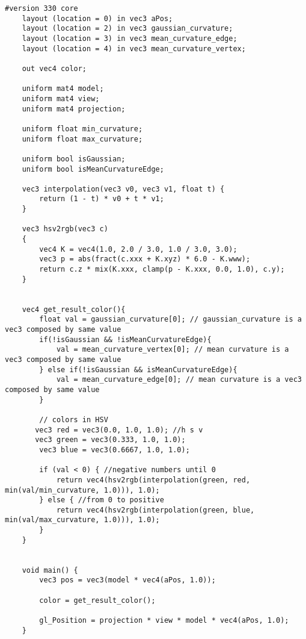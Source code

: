 \begin{lstlisting}[caption={Vertex Shader for constant/Gouraud Gaussian curvature and constant/Gouraud mean curvature (Sections: \ref{section:gc-curvature} and \ref{section:mc-curvature} \label{appendix:vs-curvature})}]
    #version 330 core
    layout (location = 0) in vec3 aPos;
    layout (location = 2) in vec3 gaussian_curvature;
    layout (location = 3) in vec3 mean_curvature_edge;
    layout (location = 4) in vec3 mean_curvature_vertex;

    out vec4 color;

    uniform mat4 model;
    uniform mat4 view;
    uniform mat4 projection;

    uniform float min_curvature;
    uniform float max_curvature;

    uniform bool isGaussian;
    uniform bool isMeanCurvatureEdge;

    vec3 interpolation(vec3 v0, vec3 v1, float t) {
        return (1 - t) * v0 + t * v1;
    }

    vec3 hsv2rgb(vec3 c)
    {
        vec4 K = vec4(1.0, 2.0 / 3.0, 1.0 / 3.0, 3.0);
        vec3 p = abs(fract(c.xxx + K.xyz) * 6.0 - K.www);
        return c.z * mix(K.xxx, clamp(p - K.xxx, 0.0, 1.0), c.y);
    }


    vec4 get_result_color(){
        float val = gaussian_curvature[0]; // gaussian_curvature is a vec3 composed by same value
        if(!isGaussian && !isMeanCurvatureEdge){
            val = mean_curvature_vertex[0]; // mean curvature is a vec3 composed by same value
        } else if(!isGaussian && isMeanCurvatureEdge){
            val = mean_curvature_edge[0]; // mean curvature is a vec3 composed by same value
        }

        // colors in HSV
       vec3 red = vec3(0.0, 1.0, 1.0); //h s v
       vec3 green = vec3(0.333, 1.0, 1.0);
        vec3 blue = vec3(0.6667, 1.0, 1.0);

        if (val < 0) { //negative numbers until 0
            return vec4(hsv2rgb(interpolation(green, red, min(val/min_curvature, 1.0))), 1.0);
        } else { //from 0 to positive
            return vec4(hsv2rgb(interpolation(green, blue, min(val/max_curvature, 1.0))), 1.0);
        }
    }


    void main() {
        vec3 pos = vec3(model * vec4(aPos, 1.0));

        color = get_result_color();

        gl_Position = projection * view * model * vec4(aPos, 1.0);
    }
\end{lstlisting}

